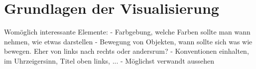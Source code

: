 
\chapter{Grundlagen der Visualisierung}

Womöglich interessante Elemente:
- Farbgebung, welche Farben sollte man wann nehmen, wie etwas darstellen
- Bewegung von Objekten, wann sollte sich was wie bewegen. Eher von links nach rechts oder andersrum?
- Konventionen einhalten, im Uhrzeigersinn, Titel oben links, ...
- Möglichst verwandt aussehen 